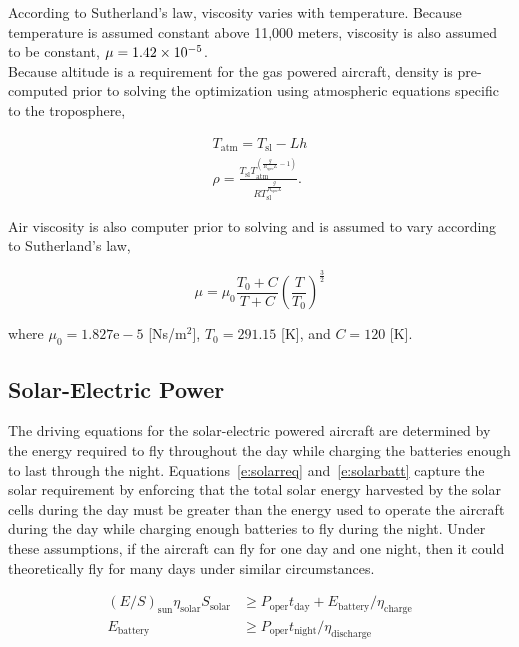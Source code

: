 \documentclass[]{aiaa-tc}%
\begin{document}
According to Sutherland's law\cite{fluiddyhandbook}, viscosity varies with temperature.  Because temperature is assumed constant above 11,000 meters\cite{isaatm}, viscosity is also assumed to be constant, $\mu=\num{1.42d-5}$. \\

Because altitude is a requirement for the gas powered aircraft, density is pre-computed prior to solving the optimization using atmospheric equations specific to the troposphere,\cite{isaatm} 

\begin{align}
    \label{e:Talt}
    T_{\text{atm}} = T_{\text{sl}} - Lh \\
    \label{e:rhot}
    \rho = \frac{T_{\text{sl}}T_{\text{atm}}^{\left( \frac{g}{R_{\text{spec}}L} -1 \right)}}{R T_{\text{sl}}^{\frac{g}{R_{\text{spec}}L}}}.
\end{align}

Air viscosity is also computer prior to solving and is assumed to vary according to Sutherland's law,\cite{fluiddyhandbook}

\begin{equation}
    \label{e:sutherland}
    \mu = \mu_0 \frac{T_0 + C}{T+C} \left( \frac{T}{T_0} \right)^{\frac{3}{2}}
\end{equation}

where $\mu_0 = 1.827\text{e}-5$ [Ns/m$^2$], $T_0 = 291.15$ [K], and $C = 120$ [K].

\subsection{Solar-Electric Power}

The driving equations for the solar-electric powered aircraft are determined by the energy required to fly throughout the day while charging the batteries enough to last through the night.  
Equations~\ref{e:solarreq} and~\ref{e:solarbatt} capture the solar requirement by enforcing that the total solar energy harvested by the solar cells during the day must be greater than the energy used to operate the aircraft during the day while charging enough batteries to fly during the night.\cite{solartech}
Under these assumptions, if the aircraft can fly for one day and one night, then it could theoretically fly for many days under similar circumstances. 

    \begin{align}
        \label{e:solarreq}
        (E/S)_{\text{sun}} \eta_{\text{solar}} S_{\text{solar}} &\geq P_{\text{oper}}t_{\text{day}} + E_{\text{battery}}/\eta_{\text{charge}} \\
        \label{e:solarbatt}
        E_{\text{battery}} &\geq P_{\text{oper}}t_{\text{night}}/\eta_{\text{discharge}}
    \end{align}
    
\end{document}
